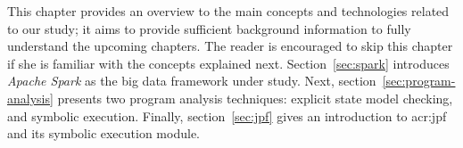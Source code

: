 \label{ch:relatedwork}

This chapter provides an overview to the main concepts and technologies related to our study; it aims to provide sufficient background information to fully understand the upcoming chapters. The reader is encouraged to skip this chapter if she is familiar with the concepts explained next. Section~\ref{sec:spark} introduces \textit{Apache Spark} as the big data framework under study. Next, section~\ref{sec:program-analysis} presents two program analysis techniques: explicit state model checking, and symbolic execution. Finally, section~\ref{sec:jpf} gives an introduction to \acrfull{acr:jpf} and its symbolic execution module.



